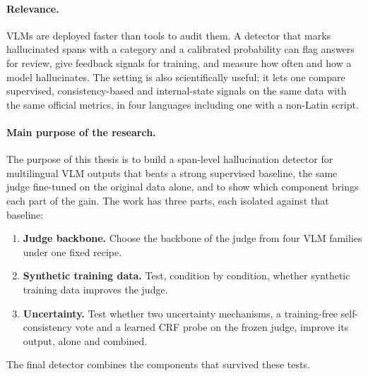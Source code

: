 \paragraph{Relevance.}
VLMs are deployed faster than tools to audit them. A detector that marks hallucinated spans with a category and a calibrated probability can flag answers for review, give feedback signals for training, and measure how often and how a model hallucinates. The setting is also scientifically useful: it lets one compare supervised, consistency-based and internal-state signals on the same data with the same official metrics, in four languages including one with a non-Latin script.

\paragraph{Main purpose of the research.}
The purpose of this thesis is to build a span-level hallucination detector for multilingual VLM outputs that beats a strong supervised baseline, the same judge fine-tuned on the original data alone, and to show which component brings each part of the gain. The work has three parts, each isolated against that baseline:
\begin{enumerate}
    \item \textbf{Judge backbone.} Choose the backbone of the judge from four VLM families under one fixed recipe.
    \item \textbf{Synthetic training data.} Test, condition by condition, whether synthetic training data improves the judge.
    \item \textbf{Uncertainty.} Test whether two uncertainty mechanisms, a training-free self-consistency vote and a learned CRF probe on the frozen judge, improve its output, alone and combined.
\end{enumerate}
The final detector combines the components that survived these tests.

